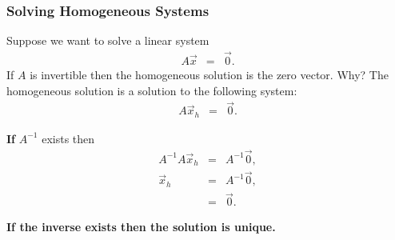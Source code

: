 \begin{frame}
  \frametitle{Solving Homogeneous Systems}
  {\color{blue}
  Suppose we want to solve a linear system
  \begin{eqnarray*}
    A \vec{x} & = & \vec{0}.
  \end{eqnarray*}
  If $A$ is invertible then the homogeneous solution is the
  zero vector.
  }
  {\color{red}Why?}
   The homogeneous solution is a solution to the following system:
  \begin{eqnarray*}
    A \vec{x}_h & = & \vec{0}.
  \end{eqnarray*}

  \textbf{If} $A^{-1}$ exists then
  \begin{eqnarray*}
    A^{-1} A \vec{x}_h & = & A^{-1} \vec{0}, \\
    \vec{x}_h & = & A^{-1} \vec{0}, \\
    & = & \vec{0}.
  \end{eqnarray*}

  \textbf{\color{red}If the inverse exists then the solution is unique.}

\end{frame}





